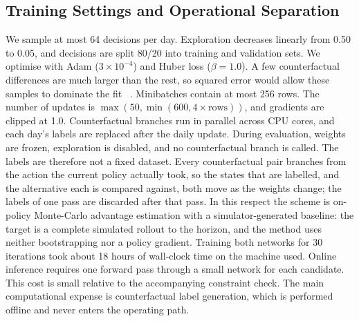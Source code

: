 \subsection{Training Settings and Operational Separation}
\label{sec:arch-train}
We sample at most 64 decisions per day. Exploration decreases linearly
from 0.50 to 0.05, and decisions are split 80/20 into training and
validation sets. We optimise with Adam ($3\times10^{-4}$) and Huber loss
($\beta=1.0$). A few counterfactual differences are much larger than the
rest, so squared error would allow these samples to dominate the fit
~\cite{refhuber}. Minibatches contain at most 256 rows. The number of
updates is $\max(50,\min(600,4\times\text{rows}))$, and gradients are
clipped at 1.0. Counterfactual branches run in parallel across CPU cores,
and each day's labels are replaced after the daily update. During
evaluation, weights are frozen, exploration is disabled, and no
counterfactual branch is called.
The labels are therefore not a fixed dataset. Every counterfactual pair
branches from the action the current policy actually took, so the states
that are labelled, and the alternative each is compared against, both
move as the weights change; the labels of one pass are discarded after
that pass. In this respect the scheme is on-policy Monte-Carlo advantage
estimation with a simulator-generated baseline: the target is a complete
simulated rollout to the horizon, and the method uses neither
bootstrapping nor a policy gradient.
Training both networks for 30 iterations took about 18 hours of
wall-clock time on the machine used. Online
inference requires one forward pass through a small network for each
candidate. This cost is small relative to the accompanying constraint
check. The main computational expense is counterfactual label
generation, which is performed offline and never enters the operating
path.
